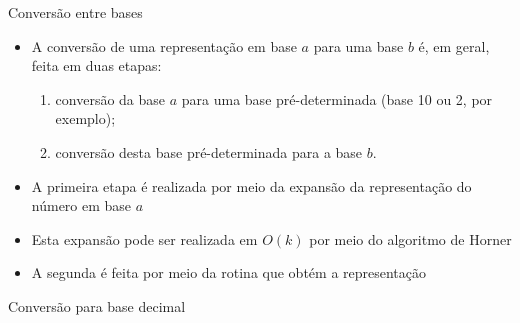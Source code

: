\begin{frame}[fragile]{Conversão entre bases}

    \begin{itemize}
        \item A conversão de uma representação em base $a$ para uma base $b$ é, em geral, feita em duas etapas:

        \begin{enumerate}
            \item conversão da base $a$ para uma base pré-determinada (base 10 ou 2, por exemplo);
            \item conversão desta base pré-determinada para a base $b$.
        \end{enumerate}

        \item A primeira etapa é realizada por meio da expansão da representação do número em base $a$

        \item Esta expansão pode ser realizada em $O(k)$ por meio do algoritmo de Horner

        \item A segunda é feita por meio da rotina que obtém a representação
    \end{itemize}

\end{frame}

\begin{frame}[fragile]{Conversão para base decimal}
\end{frame}

